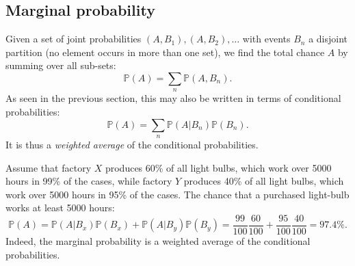 \documentclass{article}
\begin{document}
\subsection{Marginal probability}
Given a set of joint probabilities $(A,B_1),(A,B_2),\dots$ with events $B_n$ a disjoint partition (no element occurs in more than one set), we find the total chance $A$ by summing over all sub-sets:
\begin{equation}
    \mathbb{P}(A) = \sum_n \mathbb{P}(A,B_n).
\end{equation}
As seen in the previous section, this may also be written in terms of conditional probabilities:
\begin{equation}
    \mathbb{P}(A) = \sum_n \mathbb{P}(A|B_n)\mathbb{P}(B_n).
\end{equation}
It is thus a \textit{weighted average} of the conditional probabilities.
\begin{testexample}
    Assume that factory $X$ produces 60\% of all light bulbs, which work over 5000 hours in 99\% of the cases, while factory $Y$ produces 40\% of all light bulbs, which work over 5000 hours in 95\% of the cases. The chance that a purchased light-bulb works at least 5000 hours:
    \begin{equation}
        \mathbb{P}(A) = \mathbb{P}(A|B_x)\mathbb{P}(B_x) + \mathbb{P}(A|B_y)\mathbb{P}(B_y) = \frac{99}{100}\frac{60}{100} + \frac{95}{100}\frac{40}{100} = 97.4\%.
    \end{equation}
    Indeed, the marginal probability is a weighted average of the conditional probabilities.
\end{testexample}
\end{document}
